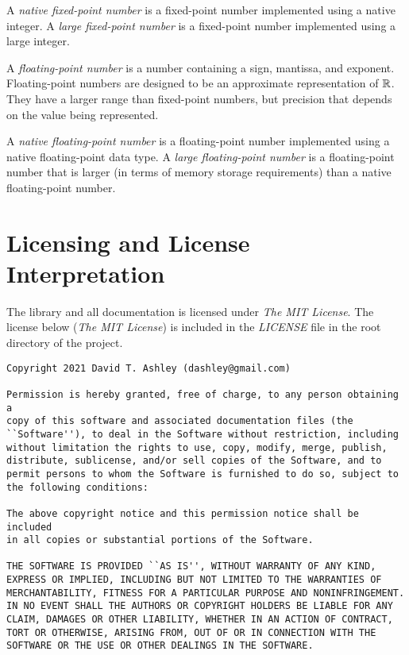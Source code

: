 A \emph{native fixed-point number} is a fixed-point number 
implemented using a native integer.  A \emph{large 
fixed-point number} is a fixed-point number implemented 
using a large integer.  

A \emph{floating-point number} 
is a number containing a sign, mantissa, and exponent.  
Floating-point numbers are designed to be an approximate 
representation of ${\mathbb{R}}$.  They have a larger range 
than fixed-point numbers, but precision that depends on the 
value being represented.  

A \emph{native floating-point number} is a floating-point 
number implemented using a native floating-point data type.  
A \emph{large floating-point number} is a floating-point 
number that is larger (in terms of memory storage 
requirements) than a native floating-point number.  


\section{Licensing and License Interpretation}
\label{ciov0:slip0}

The \emph{\productbasenameshort{}} library and all 
documentation is licensed under \emph{The MIT License}.  The 
license below (\emph{The MIT License}) is included in the 
\emph{LICENSE} file in the root directory of the project.  

\begin{small}
\begin{verbatim}
Copyright 2021 David T. Ashley (dashley@gmail.com)

Permission is hereby granted, free of charge, to any person obtaining a 
copy of this software and associated documentation files (the 
``Software''), to deal in the Software without restriction, including 
without limitation the rights to use, copy, modify, merge, publish, 
distribute, sublicense, and/or sell copies of the Software, and to 
permit persons to whom the Software is furnished to do so, subject to 
the following conditions: 

The above copyright notice and this permission notice shall be included 
in all copies or substantial portions of the Software.  

THE SOFTWARE IS PROVIDED ``AS IS'', WITHOUT WARRANTY OF ANY KIND, 
EXPRESS OR IMPLIED, INCLUDING BUT NOT LIMITED TO THE WARRANTIES OF 
MERCHANTABILITY, FITNESS FOR A PARTICULAR PURPOSE AND NONINFRINGEMENT.  
IN NO EVENT SHALL THE AUTHORS OR COPYRIGHT HOLDERS BE LIABLE FOR ANY 
CLAIM, DAMAGES OR OTHER LIABILITY, WHETHER IN AN ACTION OF CONTRACT, 
TORT OR OTHERWISE, ARISING FROM, OUT OF OR IN CONNECTION WITH THE 
SOFTWARE OR THE USE OR OTHER DEALINGS IN THE SOFTWARE.  
\end{verbatim}
\end{small}

